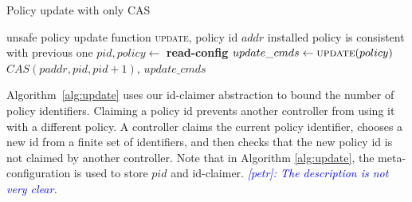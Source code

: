 \documentclass[conference]{sigcomm-alternate}
\newcommand{\hide}[1]{}
\newcommand{\addr}{\textit{addr}\xspace}
\newcommand{\paddr}{\textit{paddr}\xspace}
\newcommand{\pid}{\textit{pid}\xspace}
\newcommand{\ufunc}{update} %
\newcommand{\liron}[1]{\textit{\textcolor{mygreen}{[liron]: #1}}} %
\newcommand{\petr}[1]{\textit{\textcolor{blue}{[petr]: #1}}} %
\newcommand{\ack}{\textit{ack}}
\begin{document}



\begin{algorithm}[t]
    \caption{Policy update with only CAS}
    \label{alg:simple-update}
    \begin{algorithmic}[1]
    \Require unsafe policy update function \textsc{\ufunc}, policy id $\addr$
    \Ensure installed policy is consistent with previous one
 		\Repeat
 			\State $\pid,policy\gets$ \textbf{read-config} %
 			\State $update\_cmds\gets \textsc{\ufunc}(policy)$
 			\startTxn
	 			\State $CAS(\paddr,\pid,\pid+1)$,
	 			\State $update\_cmds$ %
 			\endTxn
     	\Until{$res=\ack$}
			\Return

    \end{algorithmic}
\end{algorithm}

%
\hide{
It takes a set of rules $U$ (not yet a policy)and proceeds as follows: first, we seek to
 obtain a unique \emph{id}. FIXME: to be continued...
 \textbf{LS: I am not sure if I need to tell every step of the story or maybe it best to explain the main dif from the previous one similarly to what I just wrote next}.
}
%

Algorithm~\ref{alg:update} uses our id-claimer abstraction
to bound the number of policy identifiers.
Claiming a policy id prevents another controller from using it with a
different policy.
A controller claims the current policy identifier, chooses a new id
from a finite set of identifiers,
and then checks that the new policy id is not claimed by another controller.
Note that in Algorithm \ref{alg:update}, the meta-configuration is
used to store $pid$ and id-claimer.
\petr{The description is not very clear.}
\end{document}
